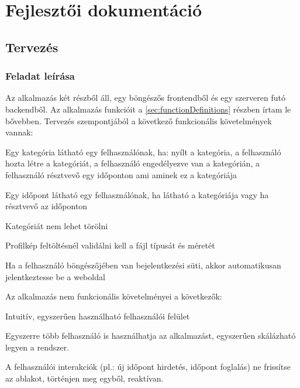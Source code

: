 \chapter{Fejlesztői dokumentáció} %
\label{ch:impl}

\section{Tervezés}

\subsection{Feladat leírása}

Az alkalmazás két részből áll, egy böngészős frontendből és egy szerveren futó backendből. Az alkalmazás funkcióit a \ref{sec:functionDefinitions} részben írtam le bővebben. Tervezés szempontjából a következő funkcionális követelmények vannak:

\begin{compactitem}
	\item Egy kategória látható egy felhasználónak, ha: nyílt a kategória, a felhasználó hozta létre a kategóriát, a felhasználó engedélyezve van a kategórián, a felhasználó résztvevő egy időponton ami aminek ez a kategóriája
	\item Egy időpont látható egy felhasználónak, ha látható a kategóriája vagy ha résztvevő az időponton
	\item Kategóriát nem lehet törölni
	\item Profilkép feltöltésnél validálni kell a fájl típusát és méretét
	\item Ha a felhasználó böngészőjében van bejelentkezési süti, akkor automatikusan jelentkeztesse be a weboldal
\end{compactitem}

Az alkalmazás nem funkcionális követelményei a következők:

\begin{compactitem}
	\item Intuitív, egyszerűen használható felhasználói felület
	\item Egyszerre több felhasználó is használhatja az alkalmazást, egyszerűen skálázható legyen a rendszer.
	\item A felhasználói interakciók (pl.: új időpont hirdetés, időpont foglalás) ne frissítse az ablakot, történjen meg egyből, reaktívan.
\end{compactitem}

\clearpage

